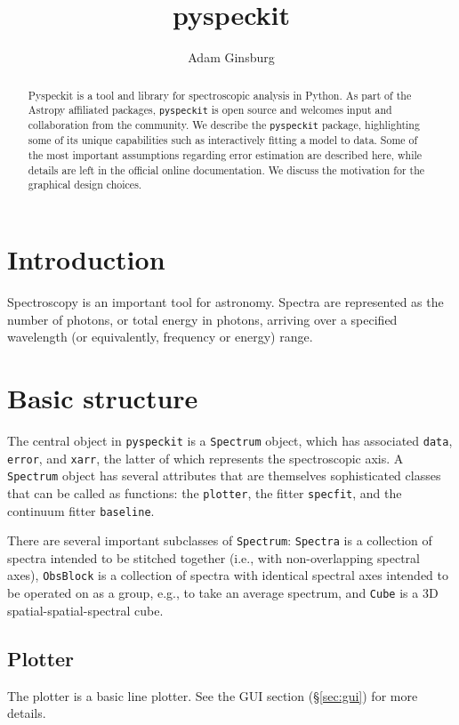 \documentclass[twocolumn]{aastex61}
\newcommand{\pyspeckit}{\texttt{pyspeckit}\xspace}
\begin{document}
\title{pyspeckit}

\author[0000-0001-6431-9633]{Adam Ginsburg}


\begin{abstract}
Pyspeckit is a tool and library for spectroscopic analysis in Python.  As part of the 
Astropy affiliated packages, \texttt{pyspeckit} is open source and welcomes input
and collaboration from the community. We describe the
\texttt{pyspeckit} package, highlighting some of its unique capabilities such as
interactively fitting a model to data. Some of the most important assumptions regarding
error estimation are described here, while details are left in the official
online documentation.  We  discuss the motivation for the graphical design
choices.
\end{abstract}


\section{Introduction}
Spectroscopy is an important tool for astronomy.  Spectra are represented as
the number of photons, or total energy in photons, arriving over a specified
wavelength (or equivalently, frequency or energy) range.



\section{Basic structure}
The central object in \pyspeckit is a \texttt{Spectrum} object, which has
associated \texttt{data}, \texttt{error}, and \texttt{xarr}, the latter of
which represents the spectroscopic axis.  A \texttt{Spectrum} object has
several attributes that are themselves sophisticated classes that can be called
as functions: the \texttt{plotter}, the fitter \texttt{specfit}, and the
continuum fitter \texttt{baseline}.

There are several important subclasses of \texttt{Spectrum}: \texttt{Spectra}
is a collection of spectra intended to be stitched together (i.e., with
non-overlapping spectral axes), \texttt{ObsBlock} is a collection of spectra
with identical spectral axes intended to be operated on as a group, e.g., to
take an average spectrum, and \texttt{Cube} is a 3D spatial-spatial-spectral
cube.

\subsection{Plotter}
The plotter is a basic line plotter.  See the GUI section (\S \ref{sec:gui})
for more details.
\end{document}
